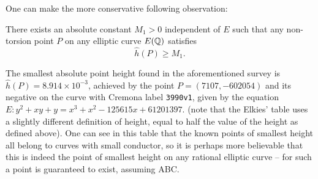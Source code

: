One can make the more conservative following observation:
\begin{corollary}[ABC]\label{conj:point_height_lower_bound}
There exists an absolute constant $M_1 >0$ independent of $E$ such that any non-torsion point $P$ on any elliptic curve $E(\mathbb{Q})$ satisfies
\begin{equation}
\hat{h}(P) \ge M_1 .
\end{equation}
\end{corollary}
The smallest absolute point height found in the aforementioned survey is $\hat{h}(P) = 8.914\times 10^{-3}$, achieved by the point $P = (7107,-602054)$ and its negative on the curve with Cremona label {\tt 3990v1}, given by the equation $E: y^2+xy+y=x^3+x^2-125615x+61201397$. (note that the Elkies' table uses a slightly different definition of height, equal to half the value of the height as defined above). One can see in this table that the known points of smallest height all belong to curves with small conductor, so it is perhaps more believable that this is indeed the point of smallest height on any rational elliptic curve -- for such a point is guaranteed to exist, assuming ABC. \\

